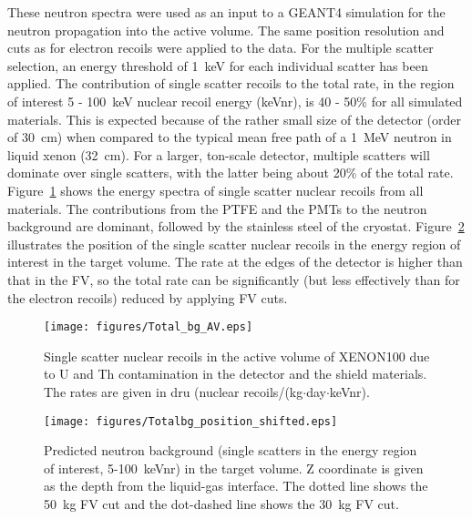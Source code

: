 These neutron spectra were used as an input to a
GEANT4 simulation for the neutron propagation into the active volume.  
The same position resolution and cuts as for electron recoils were applied to the data. For the multiple scatter selection, an energy threshold of 1~keV for each individual
scatter has been applied.
The contribution of single scatter recoils to
the total rate, in the region of interest 5 - 100~keV nuclear recoil energy (keVnr), is 40 - 50\% for all simulated materials. This is expected because of the rather small size of the detector (order of 30~cm) when compared to the typical mean free path of a 1~MeV neutron in liquid xenon (32~cm). For a larger, ton-scale detector, multiple scatters will dominate over single scatters, with
the latter being about 20\% of the total rate.
Figure~\ref{Esingles} shows the energy spectra of single scatter nuclear recoils from all materials. 
The contributions from the PTFE and the PMTs to the neutron
background are dominant, followed by the stainless steel of the cryostat.
Figure~\ref{singles-position} illustrates the position of the single scatter nuclear recoils
in the energy region of interest in the target volume. The rate at the
edges of the detector is higher than that in the FV, so the total rate can be significantly (but less effectively than for the electron recoils) reduced by applying FV cuts.

\begin{figure}[h!]
\begin{center}
 \texttt{[image: figures/Total\_bg\_AV.eps]}
\end{center}
\caption{Single scatter nuclear recoils in the active volume of XENON100 due
to U and Th contamination in the detector and the shield materials. The rates are given in dru (nuclear recoils/(kg$\cdot$day$\cdot$keVnr).}
\label{Esingles}
\end{figure} 

\begin{figure}[h!]
\begin{center}
\texttt{[image: figures/Totalbg\_position\_shifted.eps]}
\end{center}
\caption{Predicted neutron background (single scatters in the energy region of interest, 5-100~keVnr) in the target volume. Z coordinate is given as the depth from the liquid-gas interface. The dotted line shows the 50~kg FV cut and the dot-dashed line shows the 30~kg FV cut.}
\label{singles-position}
\end{figure}

